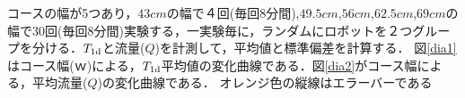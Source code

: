 コースの幅が5つあり，$43cm$の幅で４回(毎回8分間),$49.5cm$,$56cm$,$62.5cm$,$69cm$の幅で30回(毎回8分間)実験する，一実験毎に，ランダムにロボットを２つグループを分ける．$T_{\rm 1d}$と流量($Q$)を計測して，平均値と標準偏差を計算する．
図\ref{dia1}はコース幅($ｗ$)による，$T_{\rm 1d}$平均値の変化曲線である．図\ref{dia2}がコース幅による，平均流量($Q$)の変化曲線である．
オレンジ色の縦線はエラーバーである

